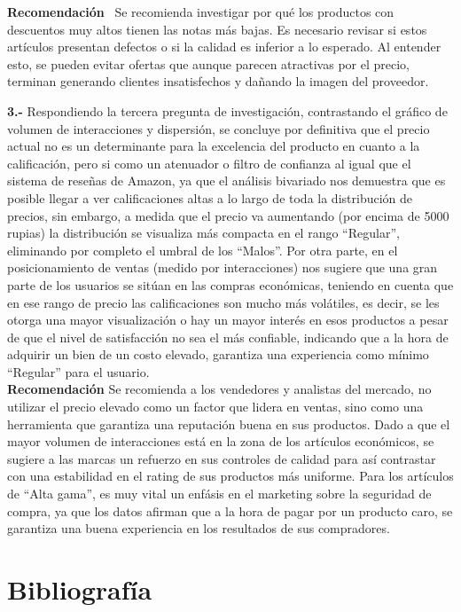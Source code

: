 \documentclass[oneside,11pt]{Latex/Classes/PhDthesisPSnPDF}
\begin{document}
\textbf{Recomendación} ~Se recomienda investigar por qué los productos
con descuentos muy altos tienen las notas más bajas. Es necesario
revisar si estos artículos presentan defectos o si la calidad es
inferior a lo esperado. Al entender esto, se pueden evitar ofertas que
aunque parecen atractivas por el precio, terminan generando clientes
insatisfechos y dañando la imagen del proveedor.

\textbf{3.-} Respondiendo la tercera pregunta de investigación,
contrastando el gráfico de volumen de interacciones y dispersión, se
concluye por definitiva que el precio actual no es un determinante para
la excelencia del producto en cuanto a la calificación, pero si como un
atenuador o filtro de confianza al igual que el sistema de reseñas de
Amazon, ya que el análisis bivariado nos demuestra que es posible llegar
a ver calificaciones altas a lo largo de toda la distribución de
precios, sin embargo, a medida que el precio va aumentando (por encima
de 5000 rupias) la distribución se visualiza más compacta en el rango
``Regular'', eliminando por completo el umbral de los ``Malos''. Por
otra parte, en el posicionamiento de ventas (medido por interacciones)
nos sugiere que una gran parte de los usuarios se sitúan en las compras
económicas, teniendo en cuenta que en ese rango de precio las
calificaciones son mucho más volátiles, es decir, se les otorga una
mayor visualización o hay un mayor interés en esos productos a pesar de
que el nivel de satisfacción no sea el más confiable, indicando que a la
hora de adquirir un bien de un costo elevado, garantiza una experiencia
como mínimo ``Regular'' para el usuario.\\

\textbf{Recomendación} Se recomienda a los vendedores y analistas del
mercado, no utilizar el precio elevado como un factor que lidera en
ventas, sino como una herramienta que garantiza una reputación buena en
sus productos. Dado a que el mayor volumen de interacciones está en la
zona de los artículos económicos, se sugiere a las marcas un refuerzo en
sus controles de calidad para así contrastar con una estabilidad en el
rating de sus productos más uniforme. Para los artículos de ``Alta
gama'', es muy vital un enfásis en el marketing sobre la seguridad de
compra, ya que los datos afirman que a la hora de pagar por un producto
caro, se garantiza una buena experiencia en los resultados de sus
compradores.\\

\chapter{Bibliografía}
\end{document}
